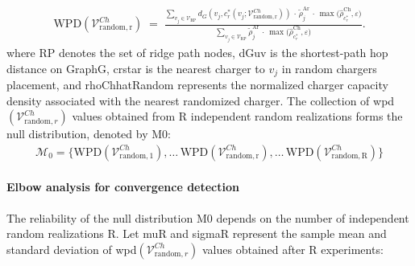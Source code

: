 \begin{align}
\label{eq:wpd_random}
\mathrm{WPD}(\mathcal{V}^{Ch}_{\mathrm{random,r}}) \;=\;
\frac{\sum\limits_{v_j \in \mathcal{V}_{\mathrm{RP}}}
    d_G(v_j, c_r^*(v_j; \mathcal{V}^{Ch}_{\mathrm{random,r}})) \,\cdot\, \tilde{\rho}^{\mathrm{Ar}}_j \,\cdot\, 
    \max\!\bigl(\widehat{\rho}^{\mathrm{Ch}}_{c_r^*}, \varepsilon\bigr)}
     {\sum\limits_{v_j \in \mathcal{V}_{\mathrm{RP}}}
    \tilde{\rho}^{\mathrm{Ar}}_j \,\cdot\, 
    \max\!\bigl(\widehat{\rho}^{\mathrm{Ch}}_{c_r^*}, \varepsilon\bigr)}.
\end{align}
where \gls{RP} denotes the set of ridge path nodes,  
\gls{dGuv} is the shortest-path hop distance on \gls{GraphG}, \gls{crstar} is the nearest charger to $v_j$ in random chargers placement,  
and \gls{rhoChhatRandom} represents the normalized charger capacity density associated with the nearest randomized charger.
The collection of \gls{wpd}$(\mathcal{V}^{Ch}_{\mathrm{random},r})$ values obtained from \gls{R} independent random realizations forms the null distribution, denoted by \gls{M0}:
\begin{align}
\mathcal{M}_0
   = 
    \{\mathrm{WPD}(\mathcal{V}^{Ch}_{\mathrm{random,1}}),\dots\, \mathrm{WPD}(\mathcal{V}^{Ch}_{\mathrm{random,r}}), \dots\,\mathrm{WPD}(\mathcal{V}^{Ch}_{\mathrm{random,R}})\}
\label{eq:null_distribution_formal}
\end{align}
\paragraph{Elbow analysis for convergence detection}
The reliability of the null distribution \gls{M0} depends on the number of independent random realizations \gls{R}. Let \gls{muR} and \gls{sigmaR} represent the sample mean and standard deviation of \gls{wpd}$(\mathcal{V}^{Ch}_{\mathrm{random},r})$ values obtained after \gls{R} experiments:

